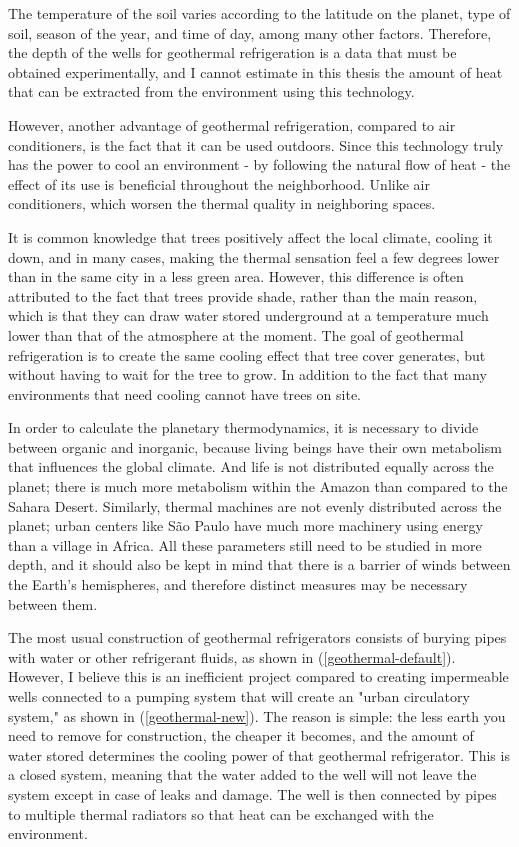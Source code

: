 The temperature of the soil varies according to the latitude on the planet, type of soil, season of the year, and time of day, among many other factors. Therefore, the depth of the wells for geothermal refrigeration is a data that must be obtained experimentally, and I cannot estimate in this thesis the amount of heat that can be extracted from the environment using this technology.

However, another advantage of geothermal refrigeration, compared to air conditioners, is the fact that it can be used outdoors. Since this technology truly has the power to cool an environment - by following the natural flow of heat - the effect of its use is beneficial throughout the neighborhood. Unlike air conditioners, which worsen the thermal quality in neighboring spaces.

It is common knowledge that trees positively affect the local climate, cooling it down, and in many cases, making the thermal sensation feel a few degrees lower than in the same city in a less green area. However, this difference is often attributed to the fact that trees provide shade, rather than the main reason, which is that they can draw water stored underground at a temperature much lower than that of the atmosphere at the moment. The goal of geothermal refrigeration is to create the same cooling effect that tree cover generates, but without having to wait for the tree to grow. In addition to the fact that many environments that need cooling cannot have trees on site.

In order to calculate the planetary thermodynamics, it is necessary to divide between organic and inorganic, because living beings have their own metabolism that influences the global climate. And life is not distributed equally across the planet; there is much more metabolism within the Amazon than compared to the Sahara Desert.
Similarly, thermal machines are not evenly distributed across the planet; urban centers like São Paulo have much more machinery using energy than a village in Africa. All these parameters still need to be studied in more depth, and it should also be kept in mind that there is a barrier of winds between the Earth's hemispheres, and therefore distinct measures may be necessary between them.

The most usual construction of geothermal refrigerators consists of burying pipes with water or other refrigerant fluids, as shown in (\autoref{geothermal-default}). However, I believe this is an inefficient project compared to creating impermeable wells connected to a pumping system that will create an "urban circulatory system," as shown in (\autoref{geothermal-new}). The reason is simple: the less earth you need to remove for construction, the cheaper it becomes, and the amount of water stored determines the cooling power of that geothermal refrigerator. This is a closed system, meaning that the water added to the well will not leave the system except in case of leaks and damage.
The well is then connected by pipes to multiple thermal radiators so that heat can be exchanged with the environment.

